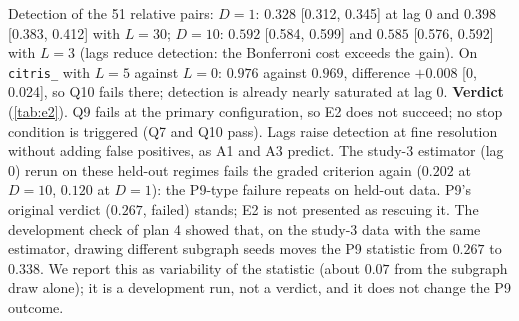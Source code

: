 Detection of the 51 relative pairs: $D=1$: $0.328$ [0.312, 0.345] at lag 0 and $0.398$ [0.383, 0.412] with $L=30$; $D=10$: $0.592$ [0.584, 0.599] and $0.585$ [0.576, 0.592] with $L=3$ (lags reduce detection: the Bonferroni cost exceeds the gain).
On \texttt{citris\_} with $L=5$ against $L=0$: $0.976$ against $0.969$, difference $+0.008$ [0, 0.024], so Q10 fails there; detection is already nearly saturated at lag 0.
\textbf{Verdict} (\cref{tab:e2}). Q9 fails at the primary configuration, so E2 does not succeed; no stop condition is triggered (Q7 and Q10 pass). Lags raise detection at fine resolution without adding false positives, as A1 and A3 predict.
The study-3 estimator (lag 0) rerun on these held-out regimes fails the graded criterion again ($0.202$ at $D=10$, $0.120$ at $D=1$): the P9-type failure repeats on held-out data. P9's original verdict ($0.267$, failed) stands; E2 is not presented as rescuing it.
The development check of plan 4 showed that, on the study-3 data with the same estimator, drawing different subgraph seeds moves the P9 statistic from $0.267$ to $0.338$. We report this as variability of the statistic (about $0.07$ from the subgraph draw alone); it is a development run, not a verdict, and it does not change the P9 outcome.

